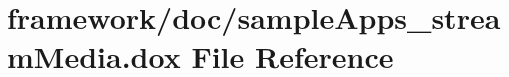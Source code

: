 \hypertarget{sample_apps__stream_media_8dox}{}\section{framework/doc/sample\+Apps\+\_\+stream\+Media.dox File Reference}
\label{sample_apps__stream_media_8dox}
